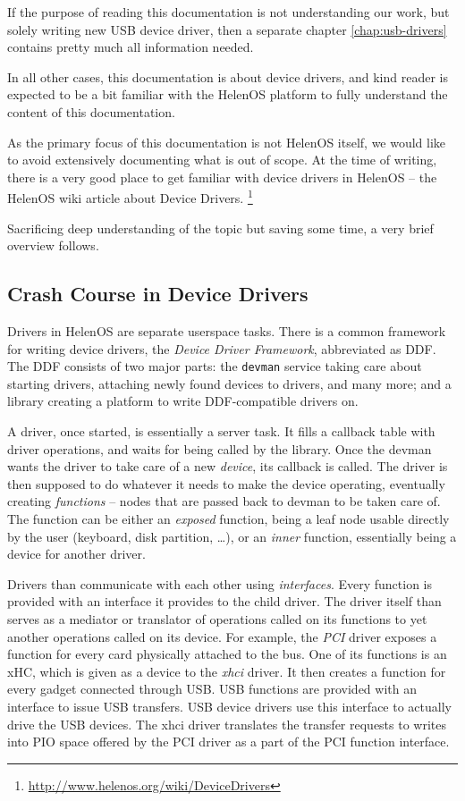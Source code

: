 If the purpose of reading this documentation is not understanding our work, but
solely writing new USB device driver, then a separate chapter \ref{chap:usb-drivers}
contains pretty much all information needed.

In all other cases, this documentation is about device drivers, and kind reader
is expected to be a bit familiar with the HelenOS platform to fully understand
the content of this documentation.

As the primary focus of this documentation is not HelenOS itself, we would like
to avoid extensively documenting what is out of scope. At the time of writing,
there is a very good place to get familiar with device drivers in HelenOS --
the HelenOS wiki article about Device Drivers.%
\footnote{\url{http://www.helenos.org/wiki/DeviceDrivers}}

Sacrificing deep understanding of the topic but saving some time, a very brief
overview follows.

\subsection{Crash Course in Device Drivers}

Drivers in HelenOS are separate userspace tasks. There is a common framework
for writing device drivers, the \emph{Device Driver Framework}, abbreviated as
DDF. The DDF consists of two major parts: the \texttt{devman} service taking
care about starting drivers, attaching newly found devices to drivers, and many
more; and a  library creating a platform to write DDF-compatible
drivers on.

A driver, once started, is essentially a server task. It fills a callback table
with driver operations, and waits for being called by the library. Once the
devman wants the driver to take care of a new \emph{device}, its
 callback is called. The driver is then supposed to do whatever
it needs to make the device operating, eventually creating \emph{functions} --
nodes that are passed back to devman to be taken care of. The function can be
either an \emph{exposed} function, being a leaf node usable directly by the user
(keyboard, disk partition, \dots), or an \emph{inner} function, essentially
being a device for another driver.

Drivers than communicate with each other using \emph{interfaces}. Every
function is provided with an interface it provides to the child driver. The
driver itself than serves as a mediator or translator of operations called on
its functions to yet another operations called on its device. For example, the
\emph{PCI} driver exposes a function for every card physically attached to the
bus. One of its functions is an xHC, which is given as a device to the
\emph{xhci} driver. It then creates a function for every gadget connected
through USB. USB functions are provided with an interface to issue USB
transfers. USB device drivers use this interface to actually drive the USB
devices. The xhci driver translates the transfer requests to writes into PIO
space offered by the PCI driver as a part of the PCI function interface.


